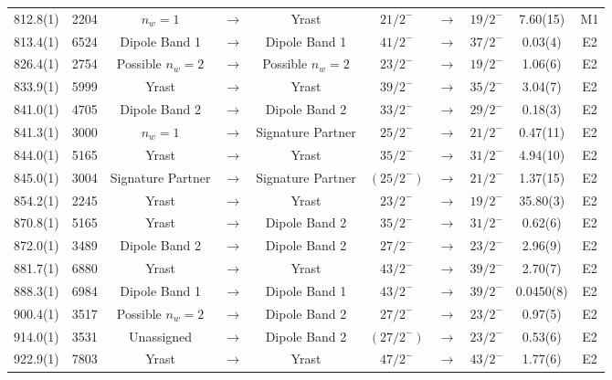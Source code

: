 \begin{landscape}
\begin{center}
\begin{longtable}{|c|c|ccc|ccc|c|c|}
 812.8(1) & 2204 & $n_w=1$ & $ \rightarrow $ & Yrast & $ 21/2^{-} $ & $ \rightarrow $ & $ 19/2^{-} $ & 7.60(15) & M1 \\
 813.4(1) & 6524 & Dipole Band 1 & $ \rightarrow $ & Dipole Band 1 & $ 41/2^{-} $ & $ \rightarrow $ & $ 37/2^{-} $ & 0.03(4) & E2 \\
 826.4(1) & 2754 & Possible $n_w=2$ & $ \rightarrow $ & Possible $n_w=2$ & $ 23/2^{-} $ & $ \rightarrow $ & $ 19/2^{-} $ & 1.06(6) & E2 \\
 833.9(1) & 5999 & Yrast & $ \rightarrow $ & Yrast & $ 39/2^{-} $ & $ \rightarrow $ & $ 35/2^{-} $ & 3.04(7) & E2 \\
 841.0(1) & 4705 & Dipole Band 2 & $ \rightarrow $ & Dipole Band 2 & $ 33/2^{-} $ & $ \rightarrow $ & $ 29/2^{-} $ & 0.18(3) & E2 \\
 841.3(1) & 3000 & $n_w=1$ & $ \rightarrow $ & Signature Partner & $ 25/2^{-} $ & $ \rightarrow $ & $ 21/2^{-} $ & 0.47(11) & E2 \\
 844.0(1) & 5165 & Yrast & $ \rightarrow $ & Yrast & $ 35/2^{-} $ & $ \rightarrow $ & $ 31/2^{-} $ & 4.94(10) & E2 \\
 845.0(1) & 3004 & Signature Partner & $ \rightarrow $ & Signature Partner & $ (25/2^{-}) $ & $ \rightarrow $ & $ 21/2^{-} $ & 1.37(15) & E2 \\
 854.2(1) & 2245 & Yrast & $ \rightarrow $ & Yrast & $ 23/2^{-} $ & $ \rightarrow $ & $ 19/2^{-} $ & 35.80(3) & E2 \\
 870.8(1) & 5165 & Yrast & $ \rightarrow $ & Dipole Band 2 & $ 35/2^{-} $ & $ \rightarrow $ & $ 31/2^{-} $ & 0.62(6) & E2 \\
 872.0(1) & 3489 & Dipole Band 2 & $ \rightarrow $ & Dipole Band 2 & $ 27/2^{-} $ & $ \rightarrow $ & $ 23/2^{-} $ & 2.96(9) & E2 \\
 881.7(1) & 6880 & Yrast & $ \rightarrow $ & Yrast & $ 43/2^{-} $ & $ \rightarrow $ & $ 39/2^{-} $ & 2.70(7) & E2 \\
 888.3(1) & 6984 & Dipole Band 1 & $ \rightarrow $ & Dipole Band 1 & $ 43/2^{-} $ & $ \rightarrow $ & $ 39/2^{-} $ & 0.0450(8) & E2 \\
 900.4(1) & 3517 & Possible $n_w=2$ & $ \rightarrow $ & Dipole Band 2 & $ 27/2^{-} $ & $ \rightarrow $ & $ 23/2^{-} $ & 0.97(5) & E2 \\
 914.0(1) & 3531 & Unassigned & $ \rightarrow $ & Dipole Band 2 & $ (27/2^{-}) $ & $ \rightarrow $ & $ 23/2^{-} $ & 0.53(6) & E2 \\
 922.9(1) & 7803 & Yrast & $ \rightarrow $ & Yrast & $ 47/2^{-} $ & $ \rightarrow $ & $ 43/2^{-} $ & 1.77(6) & E2 \\

\end{longtable}
\end{center}
\end{landscape}
